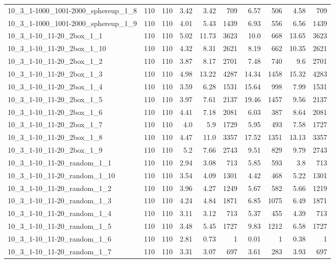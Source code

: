 \begin{center}
\begin{scriptsize}
\begin{longtable}{lrrrrrrrrr}
10\_3\_1-1000\_1001-2000\_sphereup\_1\_8 & 110 & 110 & 3.42 & 3.42 & 709 & 6.57 & 506 & 4.58 & 709\\
10\_3\_1-1000\_1001-2000\_sphereup\_1\_9 & 110 & 110 & 4.01 & 5.43 & 1439 & 6.93 & 556 & 6.56 & 1439\\
10\_3\_1-10\_11-20\_2box\_1\_1 & 110 & 110 & 5.02 & 11.73 & 3623 & 10.0 & 668 & 13.65 & 3623\\
10\_3\_1-10\_11-20\_2box\_1\_10 & 110 & 110 & 4.32 & 8.31 & 2621 & 8.19 & 662 & 10.35 & 2621\\
10\_3\_1-10\_11-20\_2box\_1\_2 & 110 & 110 & 3.87 & 8.17 & 2701 & 7.48 & 740 & 9.6 & 2701\\
10\_3\_1-10\_11-20\_2box\_1\_3 & 110 & 110 & 4.98 & 13.22 & 4287 & 14.34 & 1458 & 15.32 & 4283\\
10\_3\_1-10\_11-20\_2box\_1\_4 & 110 & 110 & 3.59 & 6.28 & 1531 & 15.64 & 998 & 7.99 & 1531\\
10\_3\_1-10\_11-20\_2box\_1\_5 & 110 & 110 & 3.97 & 7.61 & 2137 & 19.46 & 1457 & 9.56 & 2137\\
10\_3\_1-10\_11-20\_2box\_1\_6 & 110 & 110 & 4.41 & 7.18 & 2081 & 6.03 & 387 & 8.64 & 2081\\
10\_3\_1-10\_11-20\_2box\_1\_7 & 110 & 110 & 4.0 & 5.9 & 1729 & 5.95 & 493 & 7.58 & 1727\\
10\_3\_1-10\_11-20\_2box\_1\_8 & 110 & 110 & 4.47 & 11.0 & 3357 & 17.52 & 1351 & 13.13 & 3357\\
10\_3\_1-10\_11-20\_2box\_1\_9 & 110 & 110 & 5.2 & 7.66 & 2743 & 9.51 & 829 & 9.79 & 2743\\
10\_3\_1-10\_11-20\_random\_1\_1 & 110 & 110 & 2.94 & 3.08 & 713 & 5.85 & 593 & 3.8 & 713\\
10\_3\_1-10\_11-20\_random\_1\_10 & 110 & 110 & 3.54 & 4.09 & 1301 & 4.42 & 468 & 5.22 & 1301\\
10\_3\_1-10\_11-20\_random\_1\_2 & 110 & 110 & 3.96 & 4.27 & 1249 & 5.67 & 582 & 5.66 & 1219\\
10\_3\_1-10\_11-20\_random\_1\_3 & 110 & 110 & 4.24 & 4.84 & 1871 & 6.85 & 1075 & 6.49 & 1871\\
10\_3\_1-10\_11-20\_random\_1\_4 & 110 & 110 & 3.11 & 3.12 & 713 & 5.37 & 455 & 4.39 & 713\\
10\_3\_1-10\_11-20\_random\_1\_5 & 110 & 110 & 3.48 & 5.45 & 1727 & 9.83 & 1212 & 6.58 & 1727\\
10\_3\_1-10\_11-20\_random\_1\_6 & 110 & 110 & 2.81 & 0.73 & 1 & 0.01 & 1 & 0.38 & 1\\
10\_3\_1-10\_11-20\_random\_1\_7 & 110 & 110 & 3.31 & 3.07 & 697 & 3.61 & 283 & 3.93 & 697\\

\end{longtable}
\end{scriptsize}
\end{center}
